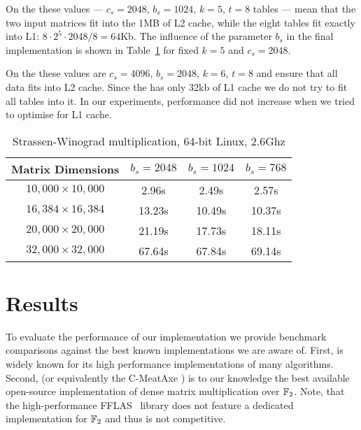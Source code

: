 On the \Opteron these values --- $c_s=2048$, $b_s=1024$, $k=5$, $t=8$ tables --- mean that the two input matrices fit into the 1MB of L2 cache, while the eight tables fit exactly into L1: $8 \cdot 2^5 \cdot 2048/8 = 64$Kb. The influence of the parameter $b_s$  in the final implementation is shown in Table~\ref{tab:parameters-opteron} for fixed $k=5$ and $c_s=2048$.

On the \CTD these values are $c_s=4096$, $b_s=2048$, $k=6$, $t=8$ and ensure that all data fits into L2 cache. Since the \CTD has only 32kb of L1 cache we do not try to fit all tables into it. In our experiments, performance did not increase when we tried to optimise for L1 cache.

\begin{table}[htbp]
\begin{footnotesize}
\begin{center}
\begin{tabular}{|c|c|c|c|}
\hline
Matrix Dimensions & $b_s=2048$ & {$b_s=1024$} & {$b_s=768$} \\
\hline
$10,000 \times 10,000$ &  2.96s  &  2.49s &  2.57s\\ 
$16,384 \times 16,384$ & 13.23s  & 10.49s & 10.37s\\
$20,000 \times 20,000$ & 21.19s  & 17.73s & 18.11s\\
$32,000 \times 32,000$ & 67.64s  & 67.84s & 69.14s\\
\hline
\end{tabular}
\caption{Strassen-Winograd multiplication, 64-bit Linux, 2.6Ghz \Opteron}
\label{tab:parameters-opteron}
\end{center}
\end{footnotesize}
\end{table}

\section{Results}
\label{sec:benchmark}
To evaluate the performance of our implementation we provide benchmark comparisons against the best known implementations we are aware of. First, \Magma \cite{magma} is widely known for its high performance implementations of many algorithms. Second, \GAP \cite{GAP4} (or equivalently the C-MeatAxe \cite{meataxe}) is to our knowledge the best available open-source implementation of dense matrix multiplication over $\mathbb{F}_2$. Note, that the high-performance FFLAS~\cite{fflas} library does not feature a dedicated implementation for $\mathbb{F}_2$ and thus is not competitive.

